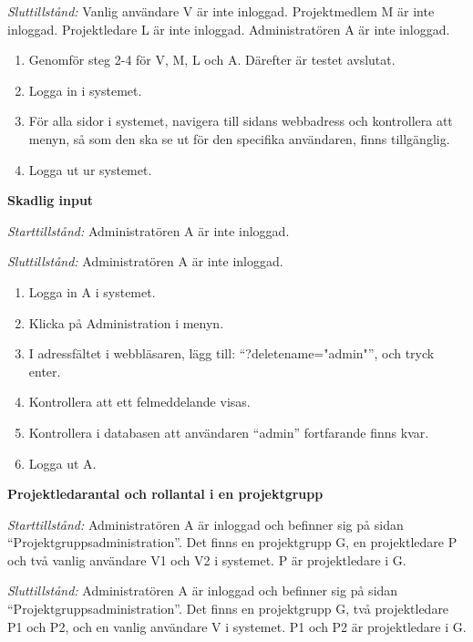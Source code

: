 \documentclass[a4paper]{article}
\begin{document}
\begin{FT}
\emph{Sluttillstånd:} Vanlig användare V är inte inloggad. Projektmedlem M är inte inloggad. Projektledare L är inte inloggad. Administratören A är inte inloggad.

\begin{enumerate}
\item Genomför steg 2-4 för V, M, L och A. Därefter är testet avslutat.
\item Logga in i systemet.
\item För alla sidor i systemet, navigera till sidans webbadress och kontrollera att menyn, så som den ska se ut för den specifika användaren, finns tillgänglig.
\item Logga ut ur systemet.
\end{enumerate}

\item \textbf{Skadlig input}

\emph{Starttillstånd:} Administratören A är inte inloggad.

\emph{Sluttillstånd:} Administratören A är inte inloggad.

\begin{enumerate}
\item Logga in A i systemet.
\item Klicka på Administration i menyn.
\item I adressfältet i webbläsaren, lägg till: ``?deletename="admin"'', och tryck enter.
\item Kontrollera att ett felmeddelande visas.
\item Kontrollera i databasen att användaren ``admin'' fortfarande finns kvar.
\item Logga ut A.
\end{enumerate}

\item \textbf{Projektledarantal och rollantal i en projektgrupp}

\emph{Starttillstånd:} Administratören A är inloggad och befinner sig på sidan ``Projektgruppsadministration''. Det finns en projektgrupp G, en projektledare P och två vanlig användare V1 och V2 i systemet. P är projektledare i G.

\emph{Sluttillstånd:} Administratören A är inloggad och befinner sig på sidan ``Projektgruppsadministration''. Det finns en projektgrupp G, två projektledare P1 och P2, och en vanlig användare V i systemet. P1 och P2 är projektledare i G.


\end{FT}
\end{document}
